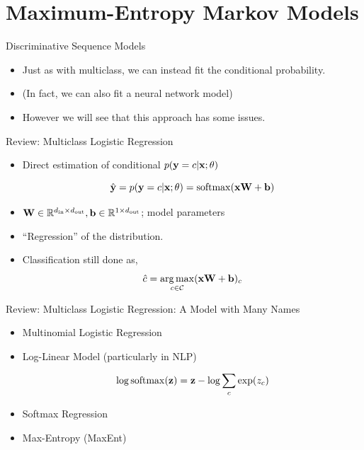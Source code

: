 \documentclass{beamer}
\begin{document}
\section{Maximum-Entropy Markov Models}

\begin{frame}{Discriminative Sequence Models}
  \begin{itemize}
  \item Just as with multiclass, we can instead fit the conditional probability.
    \air 
  \item (In fact, we can also fit a neural network model) 
    \air 

  \item However we will see that this approach has some issues.
  \end{itemize}
\end{frame}

\begin{frame}{Review: Multiclass Logistic Regression}
  \begin{itemize}
  \item Direct estimation of conditional $p(\mathbf{y} =c | \mathbf{x}; \theta)$

    \[\hat{\boldy} =  p(\boldy =c | \boldx; \theta) =  \softmax(\boldx \boldW + \boldb) \]
  \item $\mathbf{W} \in \mathbb{R}^{{d_{\mathrm{in}}} \times {d_{\mathrm{out}}}}, \mathbf{b} \in \mathbb{R}^{1 \times {d_{\mathrm{out}}}}$; model parameters

  \item ``Regression'' of the distribution.
  \item Classification still done as,
    \[ \hat{c} =  \argmax_{c \in \mcC} (\boldx \boldW + \boldb)_c  \]

  \end{itemize}
\end{frame}

\begin{frame}{Review: Multiclass Logistic Regression: A Model with Many Names}
  \begin{itemize}
  \item  Multinomial Logistic Regression


  \item Log-Linear Model (particularly in NLP)

    \[\log \softmax(\boldz) = \boldz - \log \sum_{c} \exp(z_c)  \]


  \item Softmax Regression


  \item Max-Entropy (MaxEnt)
  \end{itemize}
\end{frame}
\end{document}
